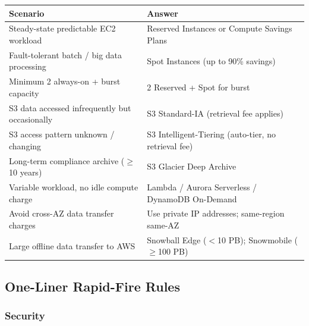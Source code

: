 \begin{comparebox}[title={Cost optimisation}]
\begin{tabular}{@{}p{6cm}p{5.5cm}@{}}
\toprule
\textbf{Scenario} & \textbf{Answer} \\
\midrule
Steady-state predictable EC2 workload          & Reserved Instances or Compute Savings Plans \\[3pt]
Fault-tolerant batch / big data processing     & Spot Instances (up to 90\% savings) \\[3pt]
Minimum 2 always-on + burst capacity           & 2 Reserved + Spot for burst \\[3pt]
S3 data accessed infrequently but occasionally & S3 Standard-IA (retrieval fee applies) \\[3pt]
S3 access pattern unknown / changing           & S3 Intelligent-Tiering (auto-tier, no retrieval fee) \\[3pt]
Long-term compliance archive ($\geq$10 years)   & S3 Glacier Deep Archive \\[3pt]
Variable workload, no idle compute charge      & Lambda / Aurora Serverless / DynamoDB On-Demand \\[3pt]
Avoid cross-AZ data transfer charges           & Use private IP addresses; same-region same-AZ \\[3pt]
Large offline data transfer to AWS             & Snowball Edge ($<$10 PB); Snowmobile ($\geq$100 PB) \\[3pt]
\bottomrule
\end{tabular}
\end{comparebox}

\subsection{One-Liner Rapid-Fire Rules}

\subsubsection{Security}

